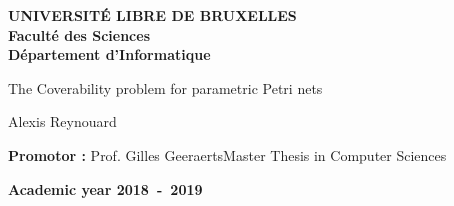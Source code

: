 \documentclass[11pt,a4paper,oneside]{book}
\theoremstyle{plain}
\theoremstyle{definition}
\begin{document}
\frontmatter
\begin{titlepage}
\begin{center}
\textbf{UNIVERSIT\'E LIBRE DE BRUXELLES}\\
\textbf{Faculté des Sciences}\\
\textbf{Département d'Informatique}
\vfill{}\vfill{}

{\Huge  The Coverability problem \vspace*{.5cm}  \linebreak[4] for parametric Petri nets}

{\Huge \par}
\begin{center}{\LARGE Alexis Reynouard}\end{center}{\Huge \par}
\vfill{}\vfill{}
\begin{flushright}{\large \textbf{Promotor :} Prof. Gilles Geeraerts}\hfill{}{\large Master Thesis in Computer Sciences}\\
{\large }\hfill{}{}\end{flushright}{\large\par}
\vfill{}\vfill{}\enlargethispage{3cm}
\textbf{Academic year 2018~-~2019}
\end{center}
\end{titlepage}
\newpage
\thispagestyle{empty} 
\null

\newenvironment{vcenterpage}
{\newpage\thispagestyle{empty} 
\vspace*{\fill}}
{\vspace*{\fill}\par\pagebreak}

%
%
%
%
\end{document}
